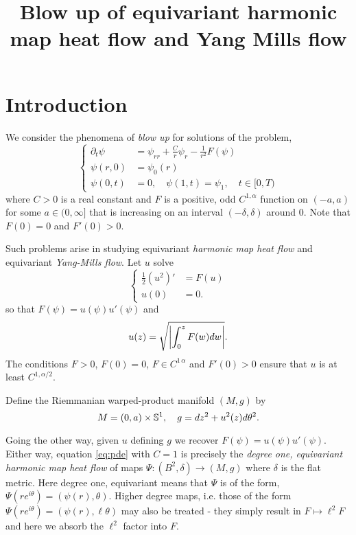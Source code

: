 \documentclass{amsart}
\begin{document}
\title[]
 {Blow up of equivariant harmonic map heat flow and Yang Mills flow}

\curraddr{}
\email{}

\dedicatory{}
\subjclass[2010]{}
\keywords{}

\begin{abstract}
\end{abstract}

\maketitle

\section{Introduction}
\label{sec:intro}

We consider the phenomena of \emph{blow up} for solutions of the problem,
\begin{equation}
\label{eq:pde}
\begin{cases}
\partial_t \psi &= \psi_{rr} + \frac{C}{r} \psi_r - \frac{1}{r^2} F(\psi) \\
\psi(r, 0) &= \psi_0(r) \\
\psi(0, t) &= 0, \quad \psi(1, t) = \psi_1, \quad t \in [0, T)
\end{cases}
\end{equation}
where \(C > 0\) is a real constant and \(F\) is a positive, odd \(C^{1,\alpha}\) function on \((-a, a)\) for some \(a \in (0, \infty]\) that is increasing on an interval \((-\delta, \delta)\) around \(0\). Note that \(F(0) = 0\) and \(F'(0) > 0\).

Such problems arise in studying equivariant \emph{harmonic map heat flow} and equivariant \emph{Yang-Mills flow}. Let \(u\) solve
\[
\begin{cases}
\frac{1}{2} (u^2)' &= F(u) \\
u(0) &= 0.
\end{cases}
\]
so that \(F(\psi) = u(\psi) u'(\psi)\) and
\[
u(z) = \sqrt{\left|{\int_0^z F(w) dw}\right|}.
\]
The conditions \(F > 0\), \(F(0) = 0\), \(F \in C^{1\,\alpha}\) and \(F'(0) > 0\) ensure that \(u\) is at least \(C^{1,\alpha/2}\).

Define the Riemmanian warped-product manifold \((M, g)\) by
\begin{equation}
\label{eq:warped_product}
M = (0, a) \times \S^1, \quad g = dz^2 + u^2(z) d\theta^2.
\end{equation}

Going the other way, given \(u\) defining \(g\) we recover \(F(\psi) = u(\psi) u'(\psi)\). Either way, equation \eqref{eq:pde}  with \(C = 1\) is precisely the \emph{degree one, equivariant harmonic map heat flow} of maps \(\Psi: (B^2, \delta) \to (M, g)\) where \(\delta\) is the flat metric. Here degree one, equivariant means that \(\Psi\) is of the form, \(\Psi(re^{i\theta}) = (\psi(r), \theta)\). Higher degree maps, i.e. those of the form \(\Psi(re^{i\theta}) = (\psi(r), \ell \theta)\) may also be treated - they simply result in \(F \mapsto \ell^2 F\) and here we absorb the \(\ell^2\) factor into \(F\).
\end{document}
